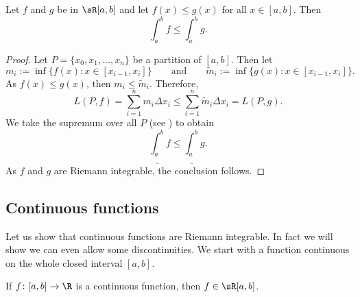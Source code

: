 \documentclass[12pt]{book}
\begin{document}
\begin{prop}[Monotonicity]
Let $f$ and $g$ be in $\sR[a,b]$ and let $f(x) \leq g(x)$
for all $x \in [a,b]$.
Then
\begin{equation*}
\int_a^b f 
\leq
\int_a^b g .
\end{equation*}
\end{prop}

\begin{proof}
Let $P = \{ x_0, x_1, \ldots, x_n \}$ be a partition of $[a,b]$.
Then
let
\begin{equation*}
m_i := \inf \{ f(x) : x \in [x_{i-1},x_i] \}
\qquad \text{and} \qquad
\widetilde{m}_i := \inf \{ g(x) : x \in [x_{i-1},x_i] \} .
\end{equation*}
As $f(x) \leq g(x)$, then $m_i \leq \widetilde{m}_i$.
Therefore,
\begin{equation*}
L(P,f)
=
\sum_{i=1}^n m_i \Delta x_i
\leq
\sum_{i=1}^n \widetilde{m}_i \Delta x_i
=
L(P,g) .
\end{equation*}
We take the supremum over all $P$ (see ) to obtain 
\begin{equation*}
\underline{\int_a^b} f 
\leq
\underline{\int_a^b} g .
\end{equation*}
As $f$ and $g$ are Riemann integrable, the conclusion follows.
\end{proof}

\subsection*{Continuous functions}

Let us show that continuous functions are Riemann integrable.
In fact we
will show we can even allow some discontinuities.
We start with a
function continuous on the whole closed interval $[a,b]$.

\begin{lemma} \label{lemma:contint}
If $f \colon [a,b] \to \R$ is a continuous function,
then $f \in \sR[a,b]$.
\end{lemma}
\end{document}
